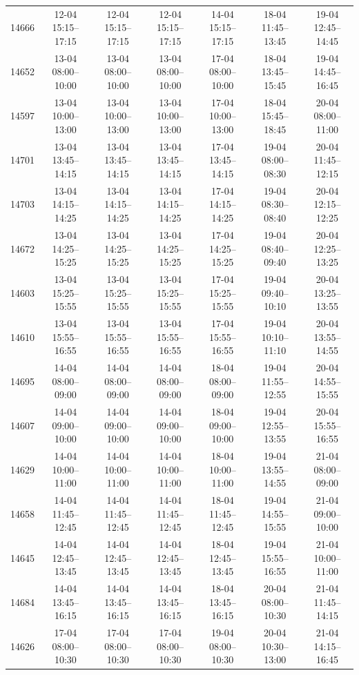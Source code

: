 \begin{table}[htbp]
\begin{tabular}{|r|c|c|c|c|c|c|}
14666 & 12-04 15:15--17:15 & 12-04 15:15--17:15 & 12-04 15:15--17:15 & 14-04 15:15--17:15 & 18-04 11:45--13:45 & 19-04 12:45--14:45 \\ 
14652 & 13-04 08:00--10:00 & 13-04 08:00--10:00 & 13-04 08:00--10:00 & 17-04 08:00--10:00 & 18-04 13:45--15:45 & 19-04 14:45--16:45 \\ 
14597 & 13-04 10:00--13:00 & 13-04 10:00--13:00 & 13-04 10:00--13:00 & 17-04 10:00--13:00 & 18-04 15:45--18:45 & 20-04 08:00--11:00 \\ 
14701 & 13-04 13:45--14:15 & 13-04 13:45--14:15 & 13-04 13:45--14:15 & 17-04 13:45--14:15 & 19-04 08:00--08:30 & 20-04 11:45--12:15 \\ 
14703 & 13-04 14:15--14:25 & 13-04 14:15--14:25 & 13-04 14:15--14:25 & 17-04 14:15--14:25 & 19-04 08:30--08:40 & 20-04 12:15--12:25 \\ 
14672 & 13-04 14:25--15:25 & 13-04 14:25--15:25 & 13-04 14:25--15:25 & 17-04 14:25--15:25 & 19-04 08:40--09:40 & 20-04 12:25--13:25 \\ 
14603 & 13-04 15:25--15:55 & 13-04 15:25--15:55 & 13-04 15:25--15:55 & 17-04 15:25--15:55 & 19-04 09:40--10:10 & 20-04 13:25--13:55 \\ 
14610 & 13-04 15:55--16:55 & 13-04 15:55--16:55 & 13-04 15:55--16:55 & 17-04 15:55--16:55 & 19-04 10:10--11:10 & 20-04 13:55--14:55 \\ 
14695 & 14-04 08:00--09:00 & 14-04 08:00--09:00 & 14-04 08:00--09:00 & 18-04 08:00--09:00 & 19-04 11:55--12:55 & 20-04 14:55--15:55 \\ 
14607 & 14-04 09:00--10:00 & 14-04 09:00--10:00 & 14-04 09:00--10:00 & 18-04 09:00--10:00 & 19-04 12:55--13:55 & 20-04 15:55--16:55 \\ 
14629 & 14-04 10:00--11:00 & 14-04 10:00--11:00 & 14-04 10:00--11:00 & 18-04 10:00--11:00 & 19-04 13:55--14:55 & 21-04 08:00--09:00 \\ 
14658 & 14-04 11:45--12:45 & 14-04 11:45--12:45 & 14-04 11:45--12:45 & 18-04 11:45--12:45 & 19-04 14:55--15:55 & 21-04 09:00--10:00 \\ 
14645 & 14-04 12:45--13:45 & 14-04 12:45--13:45 & 14-04 12:45--13:45 & 18-04 12:45--13:45 & 19-04 15:55--16:55 & 21-04 10:00--11:00 \\ 
14684 & 14-04 13:45--16:15 & 14-04 13:45--16:15 & 14-04 13:45--16:15 & 18-04 13:45--16:15 & 20-04 08:00--10:30 & 21-04 11:45--14:15 \\ 
14626 & 17-04 08:00--10:30 & 17-04 08:00--10:30 & 17-04 08:00--10:30 & 19-04 08:00--10:30 & 20-04 10:30--13:00 & 21-04 14:15--16:45 \\ 

\end{tabular}
\end{table}
